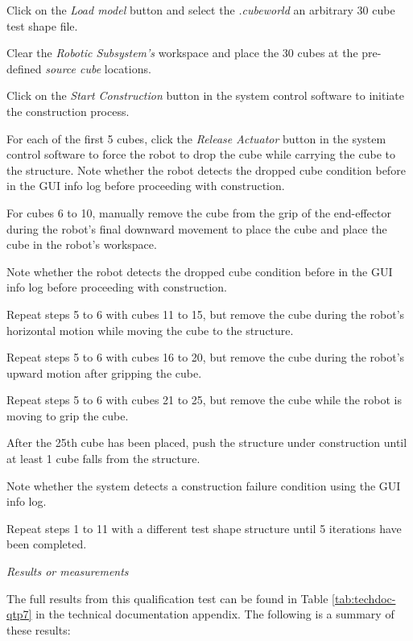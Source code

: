 \begin{compactenum}
	\item Click on the \textit{Load model} button and select the \textit{.cubeworld} an arbitrary 30 cube test shape file.
	\item Clear the \textit{Robotic Subsystem's} workspace and place the 30 cubes at the pre-defined \textit{source cube} locations.
	\item Click on the \textit{Start Construction} button in the system control software to initiate the construction process.
	\item For each of the first 5 cubes, click the \textit{Release Actuator} button in the system control software to force the robot to drop the cube while carrying the cube to the structure. Note whether the robot detects the dropped cube condition before in the GUI info log before proceeding with construction.
	\item For cubes 6 to 10, manually remove the cube from the grip of the end-effector during the robot's final downward movement to place the cube and place the cube in the robot's workspace.
	\item Note whether the robot detects the dropped cube condition before in the GUI info log before proceeding with construction.
	\item Repeat steps 5 to 6 with cubes 11 to 15, but remove the cube during the robot's horizontal motion while moving the cube to the structure.
	\item Repeat steps 5 to 6 with cubes 16 to 20, but remove the cube during the robot's upward motion after gripping the cube.
	\item Repeat steps 5 to 6 with cubes 21 to 25, but remove the cube while the robot is moving to grip the cube.
	\item After the 25th cube has been placed, push the structure under construction until at least 1 cube falls from the structure.
	\item Note whether the system detects a construction failure condition using the GUI info log.
	\item Repeat steps 1 to 11 with a different test shape structure until 5 iterations have been completed.
\end{compactenum}

\textit{Results or measurements}

The full results from this qualification test can be found in Table \ref{tab:techdoc-qtp7} in the technical documentation appendix. The following is a summary of these results:

